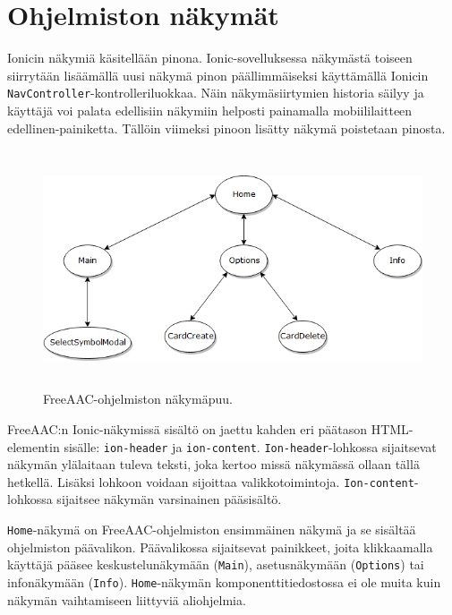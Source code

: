 \documentclass[utf8]{gradu3}
\begin{document}
\section{Ohjelmiston näkymät}

Ionicin näkymiä käsitellään pinona. Ionic-sovelluksessa näkymästä toiseen siirrytään lisäämällä uusi näkymä pinon päällimmäiseksi käyttämällä Ionicin \texttt{NavController}-kontrolleriluokkaa. Näin näkymäsiirtymien historia säilyy ja käyttäjä voi palata edellisiin näkymiin helposti painamalla mobiililaitteen edellinen-painiketta. Tällöin viimeksi pinoon lisätty näkymä poistetaan pinosta.

\begin{figure}[h]\centering
  \includegraphics[height=7cm,keepaspectratio]{FreeAACViews}
  \caption[FreeAAC-sovelluksen näkymäpuu.]
  {FreeAAC-ohjelmiston näkymäpuu.}
  \label{fig:FreeAACViews}
\end{figure}

FreeAAC:n Ionic-näkymissä sisältö on jaettu kahden eri päätason HTML-elementin sisälle: \texttt{ion-header} ja \texttt{ion-content}. \texttt{Ion-header}-lohkossa sijaitsevat näkymän ylälaitaan tuleva teksti, joka kertoo missä näkymässä ollaan tällä hetkellä. Lisäksi lohkoon voidaan sijoittaa valikkotoimintoja. \texttt{Ion-content}-lohkossa sijaitsee näkymän varsinainen pääsisältö.

\texttt{Home}-näkymä on FreeAAC-ohjelmiston ensimmäinen näkymä ja se sisältää ohjelmiston päävalikon. Päävalikossa sijaitsevat painikkeet, joita klikkaamalla käyttäjä pääsee keskustelunäkymään (\texttt{Main}), asetusnäkymään (\texttt{Options}) tai infonäkymään (\texttt{Info}). \texttt{Home}-näkymän komponenttitiedostossa ei ole muita kuin näkymän vaihtamiseen liittyviä aliohjelmia.
\end{document}
